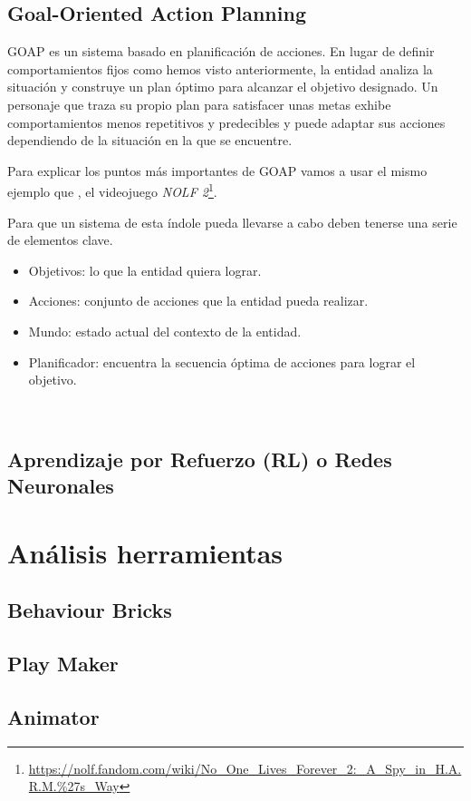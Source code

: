 \subsection{Goal-Oriented Action Planning}

GOAP es un sistema basado en planificación de acciones. En lugar de definir comportamientos fijos como hemos visto anteriormente, la entidad analiza la situación y construye un plan óptimo para alcanzar el objetivo designado.
Un personaje que traza su propio plan para satisfacer unas metas exhibe comportamientos menos repetitivos y predecibles y puede adaptar sus acciones dependiendo de la situación en la que se encuentre.

Para explicar los puntos más importantes de GOAP vamos a usar el mismo ejemplo que \citet{GOAP_Jeff_Orkin}, el videojuego \textit{NOLF 		2}\footnote{\url{https://nolf.fandom.com/wiki/No_One_Lives_Forever_2:_A_Spy_in_H.A.R.M.\%27s_Way}}.




Para que un sistema de esta índole pueda llevarse a cabo deben tenerse una serie de elementos clave.
\begin{itemize}
	 \item Objetivos: lo que la entidad quiera lograr.
	 \item Acciones: conjunto de acciones que la entidad pueda realizar.
	 \item Mundo: estado actual del contexto de la entidad.
	 \item Planificador: encuentra la secuencia óptima de acciones para lograr el objetivo.
\end{itemize}
\\ 
\subsection{Aprendizaje por Refuerzo (RL) o Redes Neuronales}
\section{Análisis herramientas}
\subsection{Behaviour Bricks}
\subsection{Play Maker}
\subsection{Animator}
